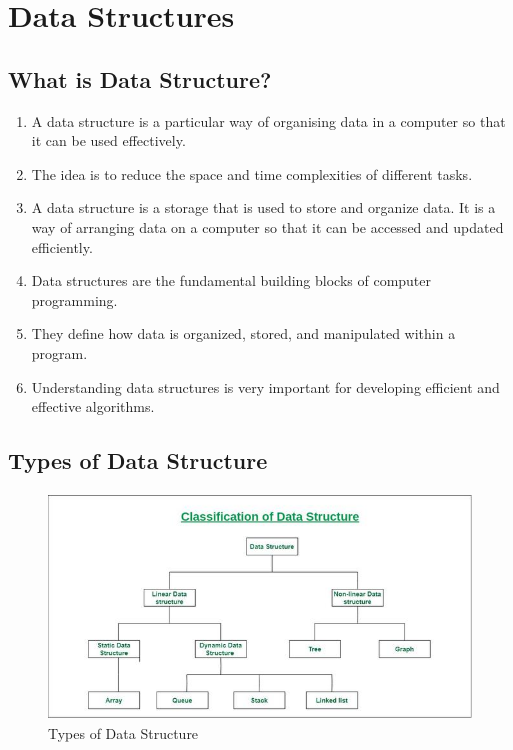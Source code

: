 \chapter{Data Structures \cite{gfg-data-structures}}\label{Data Structures}

\section{What is Data Structure? \cite{gfg-introduction-to-data-structures}}
\begin{enumerate}
    \item A data structure is a particular way of organising data in a computer so that it can be used effectively. 
    
    \item The idea is to reduce the space and time complexities of different tasks. 

    \item A data structure is a storage that is used to store and organize data. It is a way of arranging data on a computer so that it can be accessed and updated efficiently.

    \item Data structures are the fundamental building blocks of computer programming. 
    
    \item They define how data is organized, stored, and manipulated within a program. 
    
    \item Understanding data structures is very important for developing efficient and effective algorithms.
\end{enumerate}


\section{Types of Data Structure \cite{gfg-introduction-to-data-structures}}

\begin{figure}[h]
    \centering
    \includegraphics[width=0.5\linewidth,height=6cm,keepaspectratio]{Pictures/ds-algo/ClassificationofDataStructures.jpg}
    \caption{Types of Data Structure}
\end{figure}

